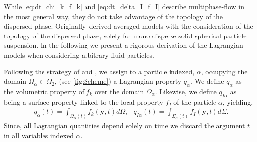 
\label{sec:dispersed-two-fluid}
While \ref{eq:dt_chi_k_f_k} and \ref{eq:dt_delta_I_f_I} describe multiphase-flow in the most general way, they do not take advantage of the topology of the dispersed phase. 
Originally, \citet{jackson1997locally,zhang1994averaged,batchelor1972sedimentation} derived averaged models with the consideration of the topology of the dispersed phase, solely for mono disperse solid spherical particle suspension. 
In the following we present a rigorous derivation of the Lagrangian models when considering arbitrary fluid particles.  

Following the strategy of \citet{paisant2014modelisation,zaepffel2012multisize,zaepffel2011modelisation,lhuillier2010multiphase} and \citet[Chapter 4]{morel2015mathematical}, 
we assign to a particle indexed, $\alpha$, occupying the domain $\Omega_\alpha \subset \Omega_2$, (see \ref{fig:Scheme}) a Lagrangian property $q_\alpha$.
We define $q_\alpha$ as the volumetric property of $f_k$ over the domain $\Omega_\alpha$.
Likewise, we define $q_{I\alpha}$ as being a surface property linked to the local property $f_I$ of the particle $\alpha$, yielding,
\begin{align*}
    &q_\alpha(t)
    = \int_{\Omega_\alpha(t)} f_k(\textbf{y},t) d\Omega,
    &q_{I\alpha}(t)
    = \int_{\Sigma_\alpha(t)} f_I(\textbf{y},t) d\Sigma.
    \label{eq:q_alpha}
\end{align*}
Since, all Lagrangian quantities depend solely on time we discard the argument $t$ in all variables indexed $\alpha$.

